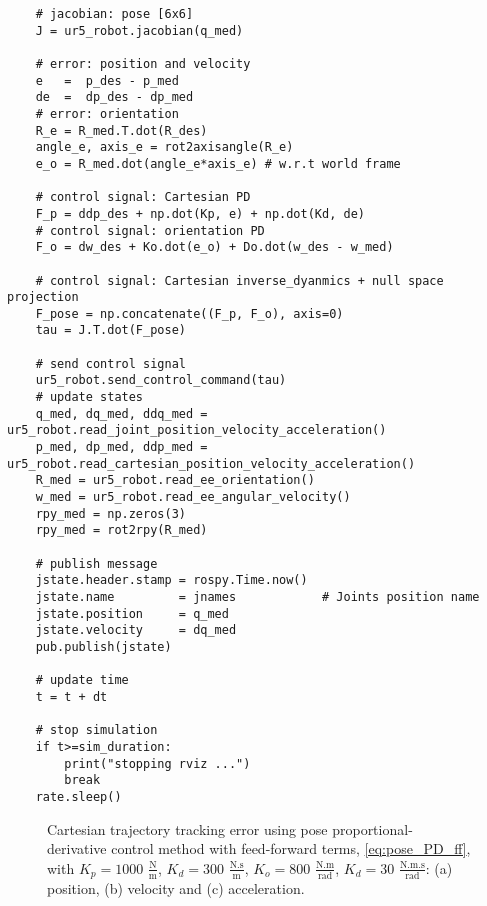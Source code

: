 \begin{lstlisting}
    # jacobian: pose [6x6]
    J = ur5_robot.jacobian(q_med)  

    # error: position and velocity
    e 	=  p_des - p_med
    de 	=  dp_des - dp_med    
    # error: orientation
    R_e = R_med.T.dot(R_des)
    angle_e, axis_e = rot2axisangle(R_e)
    e_o = R_med.dot(angle_e*axis_e) # w.r.t world frame

    # control signal: Cartesian PD
    F_p = ddp_des + np.dot(Kp, e) + np.dot(Kd, de)
    # control signal: orientation PD
    F_o = dw_des + Ko.dot(e_o) + Do.dot(w_des - w_med)
    
    # control signal: Cartesian inverse_dyanmics + null space projection
    F_pose = np.concatenate((F_p, F_o), axis=0)
    tau = J.T.dot(F_pose) 
    
    # send control signal
    ur5_robot.send_control_command(tau)
    # update states
    q_med, dq_med, ddq_med = ur5_robot.read_joint_position_velocity_acceleration()
    p_med, dp_med, ddp_med = ur5_robot.read_cartesian_position_velocity_acceleration()
    R_med = ur5_robot.read_ee_orientation()
    w_med = ur5_robot.read_ee_angular_velocity()
    rpy_med = np.zeros(3)
    rpy_med = rot2rpy(R_med)
    
    # publish message
    jstate.header.stamp = rospy.Time.now()
    jstate.name 		= jnames			# Joints position name
    jstate.position 	= q_med
    jstate.velocity 	= dq_med
    pub.publish(jstate)

    # update time
    t = t + dt  
    
    # stop simulation
    if t>=sim_duration:
        print("stopping rviz ...")
        break
    rate.sleep()
\end{lstlisting}


\begin{figure}%
	\centering
	\caption{Cartesian trajectory tracking error using pose proportional-derivative control method with feed-forward terms, \eqref{eq:pose_PD_ff}, with  ${K_{p}}=1000$ $\mathrm{\frac{N}{m}}$, $K_{d}= 300$ $\mathrm{\frac{N.s}{m}}$, ${K_{o}}=800$ $\mathrm{\frac{N.m}{rad}}$, $K_{d}= 30$ $\mathrm{\frac{N.m.s}{rad}}$: (a) position, (b) velocity and (c) acceleration.}
	\label{fig:act_3.2_ee_position_error}
\end{figure}

